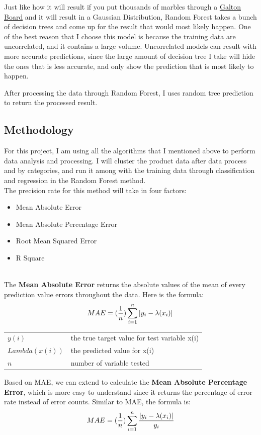 \documentclass{article}
\makeatletter
\newenvironment{conditions}
  {\par\vspace{\abovedisplayskip}\noindent\begin{tabular}{>{$}l<{$} @{${}={}$} l}}
  {\end{tabular}\par\vspace{\belowdisplayskip}}
\makeatother
\begin{document}
Just like how it will result if you put thousands of marbles through a \href{https://galtonboard.com/}{Galton Board} and it will result in a Gaussian Distribution, Random Forest takes a bunch of decision trees and come up for the result that would most likely happen. One of the best reason that I choose this model is because the training data are uncorrelated, and it contains a large volume. Uncorrelated models can result with more accurate predictions, since the large amount of decision tree I take will hide the ones that is less accurate, and only show the prediction that is most likely to happen.

After processing the data through Random Forest, I uses random tree prediction to return the processed result.

\subsection{Methodology}
For this project, I am using all the algorithms that I mentioned above to perform data analysis and processing. I will cluster the product data after data process and by categories, and run it among with the training data through classification and regression in the Random Forest method. \\

The precision rate for this method will take in four factors:\\
\begin{itemize}
    \item Mean Absolute Error
    \item Mean Absolute Percentage Error
    \item Root Mean Squared Error
    \item R Square
\end{itemize}\\
The \textbf{Mean Absolute Error} returns the absolute values of the mean of every prediction value errors throughout the data. Here is the formula:\\
\begin{equation} 
MAE = (\frac{1}{n})\sum_{i=1}^{n}\left | y_{i} -  \lambda(x_{i}) \right |\\
\end{equation}
\begin{conditions}
    y(i) & the true target value for test variable x(i)\\
    Lambda(x(i)) & the predicted value for x(i)\\
    n & number of variable tested\\
\end{conditions}
Based on MAE, we can extend to calculate the \textbf{Mean Absolute Percentage Error}, which is more easy to understand since it returns the percentage of error rate instead of error counts. Similar to MAE, the formula is: \\
\begin{equation} 
MAE = (\frac{1}{n})\sum_{i=1}^{n}\frac{\left | y_{i} -  \lambda(x_{i}) \right |}{y_{i}}\\
\end{equation}
\end{document}
